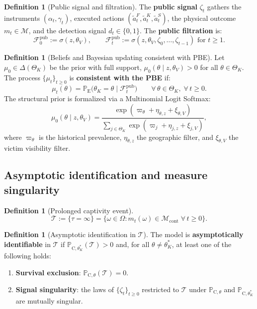 \documentclass[12pt]{article}
\theoremstyle{definition}
\newtheorem{definition}[theorem]{Definition}
\theoremstyle{remark}
\newcommand{\ProbE}{\mathbb{P}_{\mathrm{E}}}
\newcommand{\ProbC}[1]{\mathbb{P}_{\mathrm{C},#1}}
\newcommand{\1}{\mathbf{1}}
\begin{document}
\begin{definition}[Public signal and filtration]
The \textbf{public signal} $\zeta_t$ gathers the instruments $(\alpha_t,\gamma_t)$, executed actions $(\tilde{a}_t^F,\tilde{a}_t^K,\tilde{a}_t^S)$, the physical outcome $m_t\in\mathcal{M}$, and the detection signal $d_t\in\{0,1\}$. The \textbf{public filtration} is:
\[
\mathcal{F}_0^{\mathrm{pub}}:=\sigma(z, \theta_V),\qquad \mathcal{F}_t^{\mathrm{pub}}:=\sigma(z,\theta_V,\zeta_0,\ldots,\zeta_{t-1})\text{ for }t\ge 1.
\]
\end{definition}

\begin{definition}[Beliefs and Bayesian updating consistent with PBE]
Let $\mu_0\in\Delta(\Theta_K)$ be the prior with full support, $\mu_0(\theta\mid z,\theta_V)>0$ for all $\theta\in\Theta_K$. The process $\{\mu_t\}_{t\ge 0}$ is \textbf{consistent with the PBE} if:
\[
\mu_t(\theta)=\ProbE\bigl(\theta_K=\theta\mid\mathcal{F}_t^{\mathrm{pub}}\bigr)\qquad \forall\,\theta\in\Theta_K,\;\forall\,t\ge 0.
\]
The structural prior is formalized via a Multinomial Logit Softmax:
\[
\mu_0(\theta \mid z, \theta_V) = \frac{\exp\left( \varpi_\theta + \eta_{\theta,z} + \xi_{\theta,V} \right)}{\sum_{j \in \Theta_K} \exp\left( \varpi_j + \eta_{j,z} + \xi_{j,V} \right)},
\]
where $\varpi_\theta$ is the historical prevalence, $\eta_{\theta,z}$ the geographic filter, and $\xi_{\theta,V}$ the victim visibility filter.
\end{definition}

\subsection{Asymptotic identification and measure singularity}

\begin{definition}[Prolonged captivity event]
\[
\mathcal{T}:=\{\tau=\infty\}=\bigl\{\omega\in\Omega : m_t(\omega)\in\mathcal{M}_{\mathrm{cont}}\;\forall\, t\ge 0\bigr\}.
\]
\end{definition}

\begin{definition}[Asymptotic identification in $\mathcal{T}$]
The model is \textbf{asymptotically identifiable} in $\mathcal{T}$ if $\ProbC{\theta_K^\ast}(\mathcal{T})>0$ and, for all $\theta\neq\theta_K^\ast$, at least one of the following holds:
\begin{enumerate}
\item[\textup{(a)}] \textbf{Survival exclusion}: $\ProbC{\theta}(\mathcal{T})=0$.
\item[\textup{(b)}] \textbf{Signal singularity}: the laws of $\{\zeta_t\}_{t\ge 0}$ restricted to $\mathcal{T}$ under $\ProbC{\theta}$ and $\ProbC{\theta_K^\ast}$ are mutually singular.
\end{enumerate}
\end{definition}
\end{document}
